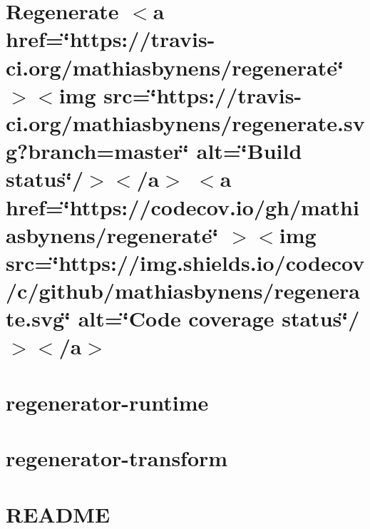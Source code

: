\documentclass[twoside]{book}
\newcommand{\+}{\discretionary{\mbox{\scriptsize$\hookleftarrow$}}{}{}}
\begin{document}
\chapter{Regenerate \texorpdfstring{$<$}{<}a href=\char`\"{}https\+://travis-\/ci.\+org/mathiasbynens/regenerate\char`\"{} \texorpdfstring{$>$}{>}\texorpdfstring{$<$}{<}img src=\char`\"{}https\+://travis-\/ci.\+org/mathiasbynens/regenerate.\+svg?branch=master\char`\"{} alt=\char`\"{}\+Build status\char`\"{}/\texorpdfstring{$>$}{>}\texorpdfstring{$<$}{<}/a\texorpdfstring{$>$}{>} \texorpdfstring{$<$}{<}a href=\char`\"{}https\+://codecov.\+io/gh/mathiasbynens/regenerate\char`\"{} \texorpdfstring{$>$}{>}\texorpdfstring{$<$}{<}img src=\char`\"{}https\+://img.\+shields.\+io/codecov/c/github/mathiasbynens/regenerate.\+svg\char`\"{} alt=\char`\"{}\+Code coverage status\char`\"{}/\texorpdfstring{$>$}{>}\texorpdfstring{$<$}{<}/a\texorpdfstring{$>$}{>}}
\label{md__c___users_vaishnavi_jadhav__desktop__developer_code_mean_stack_example_client_node_modules_regenerate__r_e_a_d_m_e}

\chapter{regenerator-\/runtime}
\label{md__c___users_vaishnavi_jadhav__desktop__developer_code_mean_stack_example_client_node_modules_regenerator_runtime__r_e_a_d_m_e}

\chapter{regenerator-\/transform}
\label{md__c___users_vaishnavi_jadhav__desktop__developer_code_mean_stack_example_client_node_modules_rb16ad4e749a13d0aaadbd082996548b2}

\chapter{README}
\label{md__c___users_vaishnavi_jadhav__desktop__developer_code_mean_stack_example_client_node_modules_regex_parser__r_e_a_d_m_e}

\end{document}
